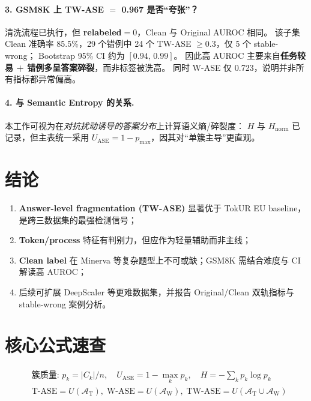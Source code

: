 \documentclass[11pt,a4paper]{article}
\begin{document}
\paragraph{3. GSM8K 上 TW-ASE $=$ 0.967 是否``夸张''？}
清洗流程已执行，但 \textbf{relabeled$=0$}，Clean 与 Original AUROC 相同。
该子集 Clean 准确率 85.5\%，29 个错例中 24 个 TW-ASE $\geq 0.3$，仅 5 个 stable-wrong；
Bootstrap 95\% CI 约为 $[0.94,\,0.99]$。
因此高 AUROC 主要来自\textbf{任务较易 + 错例多呈答案碎裂}，而非标签被洗高。
同时 W-ASE 仅 0.723，说明并非所有指标都异常偏高。

\paragraph{4. 与 Semantic Entropy 的关系.}
本工作可视为在\textit{对抗扰动诱导的答案分布}上计算语义熵/碎裂度：
$H$ 与 $H_{\mathrm{norm}}$ 已记录，但主表统一采用 $U_{\mathrm{ASE}}=1-p_{\max}$，因其对``单簇主导''更直观。

\section{结论}

\begin{enumerate}
  \item \textbf{Answer-level fragmentation (TW-ASE)} 显著优于 TokUR EU baseline，是跨三数据集的最强检测信号；
  \item \textbf{Token/process} 特征有判别力，但应作为轻量辅助而非主线；
  \item \textbf{Clean label} 在 Minerva 等复杂题型上不可或缺；GSM8K 需结合难度与 CI 解读高 AUROC；
  \item 后续可扩展 DeepScaler 等更难数据集，并报告 Original/Clean 双轨指标与 stable-wrong 案例分析。
\end{enumerate}

\appendix
\section{核心公式速查}

\begin{align*}
  &\text{簇质量: } p_k = |C_k|/n, \quad
  U_{\mathrm{ASE}} = 1 - \max_k p_k, \quad
  H = -\textstyle\sum_k p_k \log p_k \\
  &\mathrm{T\text{-}ASE} = U(\mathcal{A}_{\mathrm{T}}),\;
   \mathrm{W\text{-}ASE} = U(\mathcal{A}_{\mathrm{W}}),\;
   \mathrm{TW\text{-}ASE} = U(\mathcal{A}_{\mathrm{T}} \cup \mathcal{A}_{\mathrm{W}})
\end{align*}
\end{document}
